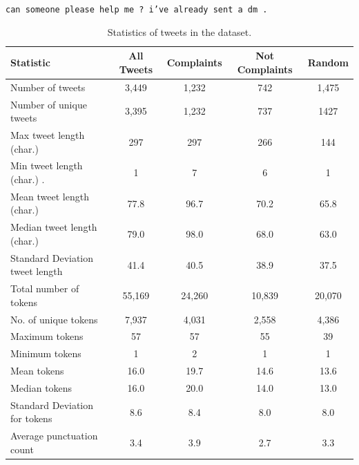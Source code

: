 \texttt{can someone please help me ? i've already sent a dm .}

\begin{table}[htbp]
    \captionsetup{font=small}
    \centering
    \begin{tabularx}{\textwidth}{|X|c|c|c|c|}
        \hline
        \rowcolor[gray]{0.7}
        \textbf{Statistic}                        & \textbf{All Tweets} & \textbf{Complaints} & \textbf{Not Complaints} & \textbf{Random} \\
        \hline
        Number of tweets                 & 3,449      & 1,232      & 742            & 1,475  \\
        \hline
        Number of unique tweets          & 3,395      & 1,232      & 737            & 1427   \\
        \hline
        \hline
        Max tweet length (char.)    & 297        & 297        & 266            & 144    \\
        \hline
        Min tweet length (char.)   .& 1          & 7          & 6              & 1      \\
        \hline
        Mean tweet length (char.)   & 77.8       & 96.7       & 70.2           & 65.8   \\
        \hline
        Median tweet length (char.) & 79.0       & 98.0       & 68.0           & 63.0   \\
        \hline
        Standard Deviation tweet length  & 41.4       & 40.5       & 38.9           & 37.5   \\
        \hline
        \hline
        Total number of tokens           & 55,169     & 24,260     & 10,839         & 20,070 \\
        \hline
        No. of unique tokens             & 7,937      & 4,031      & 2,558          & 4,386  \\
        \hline
        Maximum tokens                   & 57         & 57         & 55             & 39     \\
        \hline
        Minimum tokens                   & 1          & 2          & 1              & 1      \\
        \hline
        Mean tokens                      & 16.0       & 19.7       & 14.6           & 13.6   \\
        \hline
        Median tokens                    & 16.0       & 20.0       & 14.0           & 13.0   \\
        \hline
        Standard Deviation for tokens    & 8.6        & 8.4        & 8.0            & 8.0    \\
        \hline
        \hline
        Average punctuation count        & 3.4        & 3.9        & 2.7            & 3.3    \\
        \hline
    \end{tabularx}
    \caption{Statistics of tweets in the dataset.}
    \label{tab: tweets_statistics}
\end{table}



